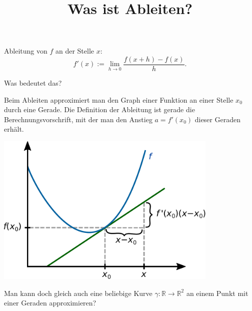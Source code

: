 \documentclass{beamer}
\title{Was ist Ableiten?}
\date{}
\newcommand{\R}{\mathbb R}
\begin{document}
\maketitle


\begin{frame}

\begin{Definition}
Ableitung von $f$ an der Stelle $x$:
\[f'(x) := \lim_{h\to 0}\frac{f(x+h)-f(x)}{h}.\]
\end{Definition}

\end{frame}


\begin{frame}
Was bedeutet das?
\end{frame}

\begin{frame}
Beim Ableiten approximiert man den Graph einer Funktion an einer
Stelle $x_0$ durch eine Gerade. Die Definition der Ableitung ist
gerade die Berechnungsvorschrift, mit der man den Anstieg $a=f'(x_0)$
dieser Geraden erhält.
\end{frame}

\begin{frame}
\begin{center}
\includegraphics[width=0.8\textwidth]{img/Ableitung.pdf}
\end{center}
\end{frame}

\begin{frame}
Man kann doch gleich auch eine beliebige Kurve $\gamma\colon\R\to\R^2$
an einem Punkt mit einer Geraden approximieren?
\end{frame}
\end{document}
